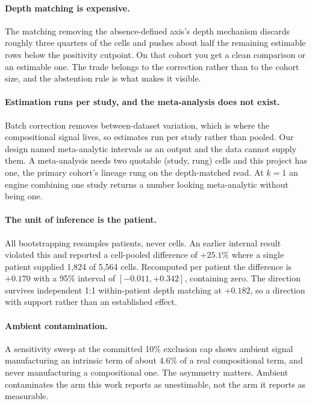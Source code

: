 \paragraph{Depth matching is expensive.} The matching removing the
absence-defined axis's depth mechanism discards roughly three quarters of the
cells and pushes about half the remaining estimable rows below the positivity
cutpoint. On that cohort you get a clean comparison or an estimable one. The
trade belongs to the correction rather than to the cohort size, and the
abstention rule is what makes it visible.

\paragraph{Estimation runs per study, and the meta-analysis does not exist.}
Batch correction removes between-dataset variation, which is where the
compositional signal lives, so estimates run per study rather than pooled. Our
design named meta-analytic intervals as an output and the data cannot supply
them. A meta-analysis needs two quotable (study, rung) cells and this project
has one, the primary cohort's lineage rung on the depth-matched read. At
$k = 1$ an engine combining one study returns a number looking meta-analytic
without being one.

\paragraph{The unit of inference is the patient.} All bootstrapping resamples
patients, never cells. An earlier internal result violated this and reported a
cell-pooled difference of $+25.1\%$ where a single patient supplied 1{,}824 of
5{,}564 cells. Recomputed per patient the difference is $+0.170$ with a 95\%
interval of $[-0.011, +0.342]$, containing zero. The direction survives
independent 1:1 within-patient depth matching at $+0.182$, so a direction with
support rather than an established effect.

\paragraph{Ambient contamination.} A sensitivity sweep at the committed 10\%
exclusion cap shows ambient signal manufacturing an intrinsic term of about 4.6\%
of a real compositional term, and never manufacturing a compositional one. The
asymmetry matters. Ambient contaminates the arm this work reports as unestimable,
not the arm it reports as measurable.

